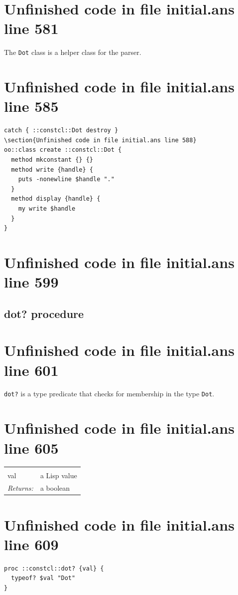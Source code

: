 \documentclass[twoside,9pt]{report}
\begin{document}
\section{Unfinished code in file initial.ans line 581}


The \texttt{Dot} class is a helper class for the parser.

\section{Unfinished code in file initial.ans line 585}
\begin{lstlisting}
catch { ::constcl::Dot destroy }
\section{Unfinished code in file initial.ans line 588}
oo::class create ::constcl::Dot {
  method mkconstant {} {}
  method write {handle} {
    puts -nonewline $handle "."
  }
  method display {handle} {
    my write $handle
  }
}
\end{lstlisting}
\section{Unfinished code in file initial.ans line 599}
\subsection{dot? procedure}
\label{dot?-procedure}
\section{Unfinished code in file initial.ans line 601}


\texttt{dot?} is a type predicate that checks for membership in the type \texttt{Dot}.

\section{Unfinished code in file initial.ans line 605}
\noindent\begin{tabular}{ |p{1.9cm} p{8cm}| }
\hline
\rowcolor[HTML]{CCCCCC} \multicolumn{2}{|l|}{\bf dot? (internal)} \\
val & a Lisp value \\
\textit{Returns:} & a boolean \\
\hline
\end{tabular}
\section{Unfinished code in file initial.ans line 609}
\begin{lstlisting}
proc ::constcl::dot? {val} {
  typeof? $val "Dot"
}
\end{lstlisting}
\end{document}
